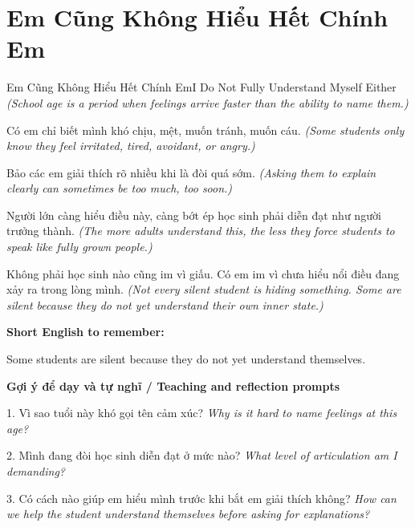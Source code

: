 \section{Em Cũng Không Hiểu Hết Chính Em}
\begin{truyen}{Em Cũng Không Hiểu Hết Chính Em}{I Do Not Fully Understand Myself Either}
\textit{(School age is a period when feelings arrive faster than the ability to name them.)}

Có em chỉ biết mình khó chịu, mệt, muốn tránh, muốn cáu.
\textit{(Some students only know they feel irritated, tired, avoidant, or angry.)}

Bảo các em giải thích rõ nhiều khi là đòi quá sớm.
\textit{(Asking them to explain clearly can sometimes be too much, too soon.)}

Người lớn càng hiểu điều này, càng bớt ép học sinh phải diễn đạt như người trưởng thành.
\textit{(The more adults understand this, the less they force students to speak like fully grown people.)}

\end{truyen}

\begin{baihoc}
Không phải học sinh nào cũng im vì giấu. Có em im vì chưa hiểu nổi điều đang xảy ra trong lòng mình.
\textit{(Not every silent student is hiding something. Some are silent because they do not yet understand their own inner state.)}
\end{baihoc}

\begin{ghinhoanh}
\textbf{Short English to remember:}

Some students are silent because they do not yet understand themselves.

\end{ghinhoanh}

\begin{tuhocnhanh}
\textbf{Gợi ý để dạy và tự nghĩ / Teaching and reflection prompts}

1. Vì sao tuổi này khó gọi tên cảm xúc? \textit{Why is it hard to name feelings at this age?}

2. Mình đang đòi học sinh diễn đạt ở mức nào? \textit{What level of articulation am I demanding?}

3. Có cách nào giúp em hiểu mình trước khi bắt em giải thích không? \textit{How can we help the student understand themselves before asking for explanations?}
\end{tuhocnhanh}
\ngancach

